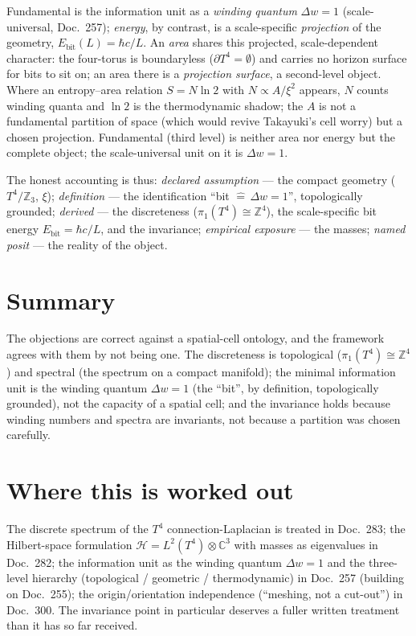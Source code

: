 Fundamental is the information unit as a \emph{winding quantum} $\Delta w = 1$
(scale-universal, Doc.~257); \emph{energy}, by contrast, is a scale-specific
\emph{projection} of the geometry, $E_\text{bit}(L) = \hbar c / L$. An \emph{area}
shares this projected, scale-dependent character: the four-torus is boundaryless
($\partial T^4 = \emptyset$) and carries no horizon surface for bits to sit on; an area
there is a \emph{projection surface}, a second-level object. Where an entropy--area
relation $S = N\ln 2$ with $N \propto A/\xi^2$ appears, $N$ counts winding quanta and
$\ln 2$ is the thermodynamic shadow; the $A$ is not a fundamental partition of space
(which would revive Takayuki's cell worry) but a chosen projection. Fundamental (third
level) is neither area nor energy but the complete object; the scale-universal unit on
it is $\Delta w = 1$.

The honest accounting is thus: \emph{declared assumption} --- the compact geometry
($T^4/\mathbb{Z}_3$, $\xi$); \emph{definition} --- the identification \enquote{bit
$\widehat{=}\,\Delta w = 1$}, topologically grounded; \emph{derived} --- the
discreteness ($\pi_1(T^4)\cong\mathbb{Z}^4$), the scale-specific bit energy
$E_\text{bit} = \hbar c/L$, and the invariance; \emph{empirical exposure} --- the
masses; \emph{named posit} --- the reality of the object.

\section{Summary}

The objections are correct against a spatial-cell ontology, and the framework agrees
with them by not being one. The discreteness is topological ($\pi_1(T^4)\cong\mathbb{Z}^4$)
and spectral (the spectrum on a compact manifold); the minimal information unit is the
winding quantum $\Delta w = 1$ (the \enquote{bit}, by definition, topologically
grounded), not the capacity of a spatial cell; and the invariance holds because winding
numbers and spectra are invariants, not because a partition was chosen carefully.

\section{Where this is worked out}

The discrete spectrum of the $T^4$ connection-Laplacian is treated in Doc.~283; the
Hilbert-space formulation $\mathcal{H}=L^2(T^4)\otimes\mathbb{C}^3$ with masses as
eigenvalues in Doc.~282; the information unit as the winding quantum $\Delta w = 1$ and
the three-level hierarchy (topological / geometric / thermodynamic) in Doc.~257
(building on Doc.~255); the origin/orientation independence (\enquote{meshing, not a
cut-out}) in Doc.~300. The invariance point in particular deserves a fuller written
treatment than it has so far received.

